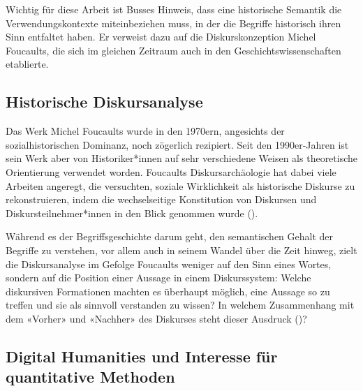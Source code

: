 Wichtig für diese Arbeit ist Busses Hinweis, dass eine historische Semantik die Verwendungskontexte miteinbeziehen muss, in der die Begriffe historisch ihren Sinn entfaltet haben. Er verweist dazu auf die Diskurskonzeption Michel Foucaults, die sich im gleichen Zeitraum auch in den Geschichtswissenschaften etablierte.

\subsection{Historische Diskursanalyse}

Das Werk Michel Foucaults wurde in den 1970ern, angesichts der sozialhistorischen Dominanz, noch zögerlich rezipiert. Seit den 1990er-Jahren ist sein Werk aber von Historiker*innen auf sehr verschiedene Weisen als theoretische Orientierung verwendet worden. Foucaults Diskursarchäologie hat dabei viele Arbeiten angeregt, die versuchten, soziale Wirklichkeit als historische Diskurse zu rekonstruieren, indem die wechselseitige Konstitution von Diskursen und Diskursteilnehmer*innen in den Blick genommen wurde (\cite{landwehr_historische_2018}).

Während es der Begriffsgeschichte darum geht, den semantischen Gehalt der Begriffe zu verstehen, vor allem auch in seinem Wandel über die Zeit hinweg, zielt die Diskursanalyse im Gefolge Foucaults weniger auf den Sinn eines Wortes, sondern auf die Position einer Aussage in einem Diskurssystem: Welche diskursiven Formationen machten es überhaupt möglich, eine Aussage so zu treffen und sie als sinnvoll verstanden zu wissen? In welchem Zusammenhang mit dem «Vorher» und «Nachher» des Diskurses steht dieser Ausdruck (\cite[159-160]{sarasin_sozialgeschichte_2012})?

\subsection{Digital Humanities und Interesse für quantitative Methoden}

